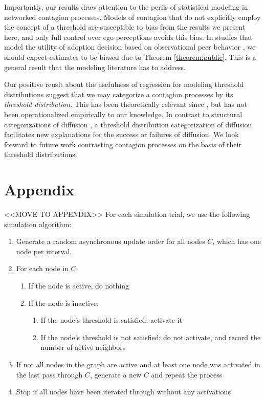 \documentclass[a4paper]{article}
\newcommand\blankpage{%
    \null
    \thispagestyle{empty}%
    \addtocounter{page}{-1}%
    \newpage}
\begin{document}
Importantly, our results draw attention to the perils of statistical modeling in networked contagion processes. Models of contagion that do not explicitly employ the concept of a threshold are susceptible to bias from the results we present here, and only full control over ego perceptions avoids this bias. In studies that model the utility of adoption decision based on observational peer behavior \parencite{econ stuff, christakis}, we should expect estimates to be biased due to Theorem \ref{theorem:public}. This is a general result that the modeling literature has to address. 

Our positive reuslt about the usefulness of regression for modeling threshold distributions suggest that we may categorize a contagion processes by its \emph{threshold distribution}. This has been theoretically relevant since \cite{Granovetter1978}, but has not been operationalized empirically to our knowledge. In contrast to structural categorizations of diffusion \parencite{Goel2012}, a threshold distribution categorization of diffusion facilitates new explanations for the success or failures of diffusion. We look forward to future work contrasting contagion processes on the basis of their threshold distributions.

\blankpage
\blankpage
\blankpage
\blankpage

\section{Appendix}

<<MOVE TO APPENDIX>>
For each simulation trial, we use the following simulation algorithm:
\begin{enumerate}
\item Generate a random asynchronous update order for all nodes $C$, which has one node per interval.
\item For each node in $C$:
	\begin{enumerate}
	\item If the node is active, do nothing
    \item If the node is inactive:
    	\begin{enumerate}
        \item If the node's threshold is satisfied: activate it
        \item If the node's threshold is not satisfied: do not activate, and record the number of active neighbors
        \end{enumerate}
	\end{enumerate}
\item If not all nodes in the graph are active and at least one node was activated in the last pass through $C$, generate a new $C$ and repeat the process
\item Stop if all nodes have been iterated through without any activations
\end{enumerate}
\end{document}
